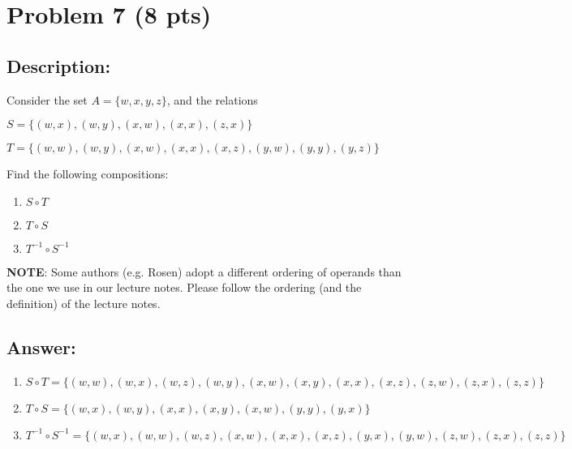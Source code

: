 \newpage

\section{Problem 7 (8 pts)}
\subsection{Description:}

Consider the set $A = \{ w, x, y, z \}$, and the relations

\begin{description}

\item $S = \{ (w, x), (w, y), (x, w), (x, x), (z, x) \}$

\item $T = \{ (w, w), (w, y), (x, w), (x, x),  (x, z), (y, w), (y, y), (y, z) \}$
\end{description}

\noindent Find the following compositions:

\begin{enumerate}
\item $S \circ T$

\item $T \circ S$

\item $T^{-1} \circ S^{-1}$
\end{enumerate}

\noindent \textbf{NOTE}: Some authors (e.g. Rosen) adopt a different ordering of operands than the one we use in our lecture notes. Please follow the ordering (and the definition) of the lecture notes.\\

\subsection{Answer:}

\begin{enumerate}
    \item $S \circ T = \{ (w, w), (w, x), (w, z), (w, y), (x, w), (x, y), (x, x), (x, z),(z, w), (z, x), (z, z) \}$
    
    \item $T \circ S = \{ (w, x), (w, y), (x, x), (x, y), (x, w), (y, y), (y, x)  \}$
    
    \item $T^{-1} \circ S^{-1} = \{ (w, x), (w, w), (w, z), (x, w), (x, x), (x, z), (y, x),(y, w), (z, w), (z, x), (z, z) \}$
\end{enumerate}
